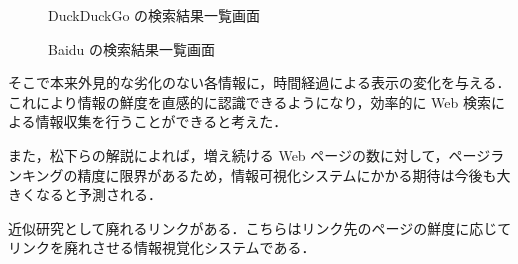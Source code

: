 \begin{figure}[htbp]
  \begin{minipage}{0.5\hsize}
    \begin{center}
    \end{center}
    \caption{DuckDuckGo の検索結果一覧画面}
  \end{minipage}
  \begin{minipage}{0.5\hsize}
    \begin{center}
    \end{center}
    \caption{Baidu の検索結果一覧画面}
  \end{minipage}
\end{figure}

そこで本来外見的な劣化のない各情報に，時間経過による表示の変化を与える．これにより情報の鮮度を直感的に認識できるようになり，効率的に Web 検索による情報収集を行うことができると考えた．

また，松下\cite{tecvisinfo}らの解説によれば，増え続ける Web ページの数に対して，ページランキングの精度に限界があるため，情報可視化システムにかかる期待は今後も大きくなると予測される．

近似研究として廃れるリンク\cite{dyinglink}がある．こちらはリンク先のページの鮮度に応じてリンクを廃れさせる情報視覚化システムである．

